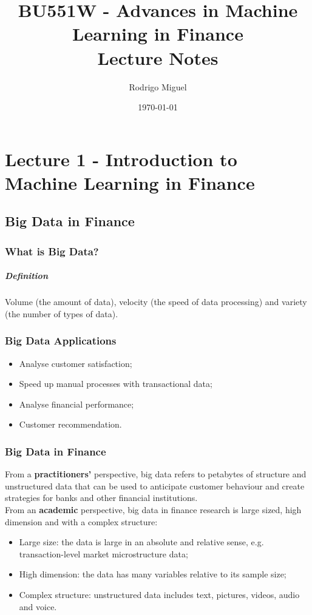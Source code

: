\documentclass[11pt,a4paper]{report}
\title{BU551W - Advances in Machine Learning in Finance \\ Lecture Notes}
\author{Rodrigo Miguel}
\date{\today}
\begin{document}
\maketitle
\tableofcontents

\chapter{Lecture 1 - Introduction to Machine Learning in Finance}
\section{Big Data in Finance}
\subsection{What is Big Data?}
\paragraph{Definition} Volume (the amount of data), velocity (the speed of data processing) and variety (the number of types of data).
\subsection{Big Data Applications}
\begin{itemize}
    \item Analyse customer satisfaction;
    \item Speed up manual processes with transactional data;
    \item Analyse financial performance;
    \item Customer recommendation.
\end{itemize}
\subsection{Big Data in Finance}
From a \textbf{practitioners'} perspective, big data refers to petabytes of structure and unstructured data that can be used to anticipate customer behaviour and create strategies for banks and other financial institutions.
\\
From an \textbf{academic} perspective, big data in finance research is large sized, high dimension and with a complex structure:
\begin{itemize}
    \item Large size: the data is large in an absolute and relative sense, e.g. transaction-level market microstructure data;
    \item High dimension: the data has many variables relative to its sample size;
    \item Complex structure: unstructured data includes text, pictures, videos, audio and voice.
\end{itemize}
\end{document}
